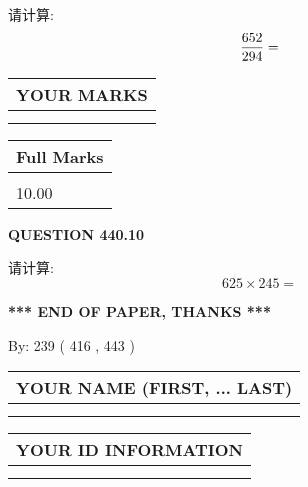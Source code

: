 \documentclass{ctexart}
\begin{document}
  
 
请计算:
\begin{equation}
\frac { %
652 }  {  %
294} = \nonumber
\end{equation}
 

 

 
  
\vspace{0.2in}
  
\noindent\begin{tabular}{|l|}
\hline
 YOUR MARKS  \\
\hline
 \\ 
 \\ 
\hline
\end{tabular}
\hspace{0.05in} \begin{tabular}{|l|}
\hline
 Full Marks  \\
\hline
 \\ 
10.00 \\
\hline
\end{tabular}
{\textbf{\Large{QUESTION
440.10 
}}}
  
  
 
请计算:
\begin{equation}
625  \times    %
245 = \nonumber
\end{equation}
 

 

 
   
   
 \vspace{0.2in}
 
   
   
   
   
\vspace{1.0in} 
{\textbf{\large{ *** END OF PAPER, THANKS *** }}} 
   
   
\hspace{1.0in} By: 
 239 ( 416 ,  443 )
   
   
   
   
\newpage 
\setcounter{page}{ 
   441001 } 
   
   
   
   
\noindent\begin{tabular}{|l|}
\hline
YOUR NAME (FIRST, ... LAST)  \\
\hline
 \\ 
 \\ 
\hline
\end{tabular}
\hspace{0.05in} \begin{tabular}{|l|}
\hline
 YOUR   ID   INFORMATION  \\
\hline
 \\ 
 \\ 
\hline
\end{tabular}
   
\end{document}
